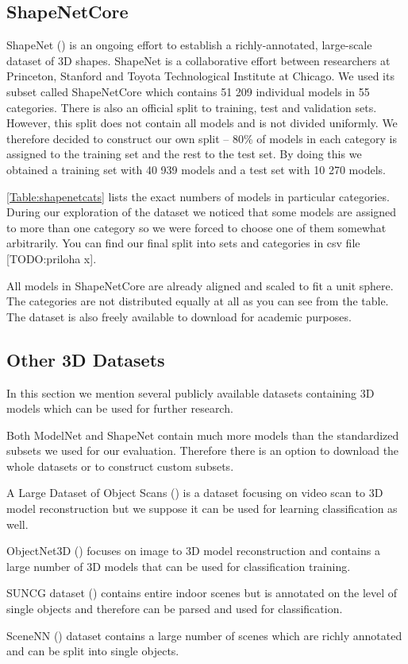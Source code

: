 \subsection{ShapeNetCore}
\label{sec:shapenetcore}
ShapeNet (\cite{chang_shapenet:_2015}) is an ongoing effort to establish a richly-annotated, large-scale dataset of 3D shapes. ShapeNet is a collaborative effort between researchers at Princeton, Stanford and Toyota Technological Institute at Chicago. We used its subset called ShapeNetCore which contains 51 209 individual models in 55 categories. There is also an official split to training, test and validation sets. However, this split does not contain all models and is not divided uniformly. We therefore decided to construct our own split -- 80\% of models in each category is assigned to the training set and the rest to the test set. By doing this we obtained a training set with 40 939 models and a test set with 10 270 models. \par \autoref{Table:shapenetcats} lists the exact numbers of models in particular categories. During our exploration of the dataset we noticed that some models are assigned to more than one category so we were forced to choose one of them somewhat arbitrarily. You can find our final split into sets and categories in csv file [TODO:priloha x].\par



All models in ShapeNetCore are already aligned and scaled to fit a unit sphere. The categories are not distributed equally at all as you can see from the table. The dataset is also freely available to download for academic purposes.




\subsection{Other 3D Datasets}
In this section we mention several publicly available datasets containing 3D models which can be used for further research. \par
Both ModelNet and ShapeNet contain much more models than the standardized subsets we used for our evaluation. Therefore there is an option to download the whole datasets or to construct custom subsets. \par
A Large Dataset of Object Scans (\cite{choi_large_2016}) is a dataset focusing on video scan to 3D model reconstruction but we suppose it can be used for learning classification as well.  \par
ObjectNet3D (\cite{xiang_objectnet3d:_2016}) focuses on image to 3D model reconstruction and contains a large number of 3D models that can be used for classification training.\par
SUNCG dataset (\cite{song_semantic_2017}) contains entire indoor scenes but is annotated on the level of single objects and therefore can be parsed and used for classification. \par
SceneNN (\cite{hua_scenenn:_2016}) dataset contains a large number of scenes which are richly annotated and can be split into single objects.

